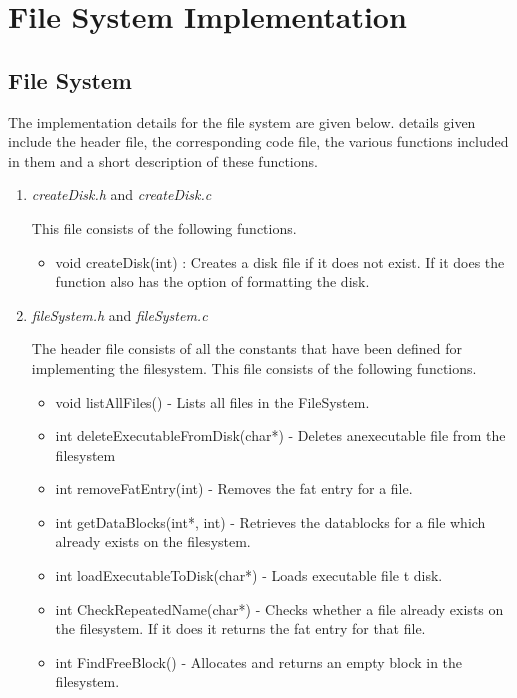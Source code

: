 \chapter{File System Implementation}
\label{chp:fileSysImpl}

\section{File System}
The implementation details for the file system are given below. details given include the header file, the corresponding code file, the various functions included in them and a short description of these functions.
\begin{enumerate}
	\item \textit{createDisk.h} and \textit{createDisk.c} 

	This file consists of the following functions.
	\begin{itemize}
		\item void createDisk(int) : Creates a disk file if it does not exist. If it does the function also has the option of formatting the disk.
	\end{itemize}
	
	\item \textit{fileSystem.h} and \textit{fileSystem.c}
	
	The header file consists of all the constants that have been defined for implementing the filesystem. This file consists of the following functions.
	\begin{itemize}
		\item void listAllFiles() - Lists all files in the FileSystem.
		
		\item int deleteExecutableFromDisk(char*) - Deletes anexecutable file from the filesystem
		
		\item int removeFatEntry(int) - Removes the fat entry for a file.
		
		\item int getDataBlocks(int*, int) - Retrieves the datablocks for a file which already exists on the filesystem.
		
		\item int loadExecutableToDisk(char*) - Loads executable file t disk.
		
		\item int CheckRepeatedName(char*) - Checks whether a file already exists on the filesystem. If it does it returns the fat entry for that file.
		\item int FindFreeBlock() - Allocates and returns an empty block in the filesystem.
		

\end{itemize}
\end{enumerate}
